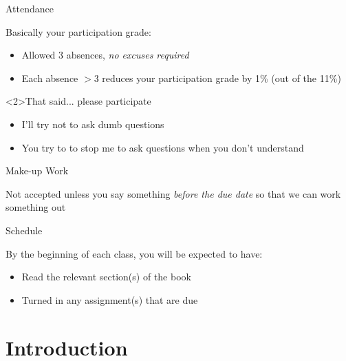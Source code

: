 \documentclass{beamer}
\begin{document}
    \begin{frame}{Attendance}
      \begin{block}{}
        Basically your participation grade:
        \begin{itemize}
          \item Allowed 3 absences, \emph{no excuses required}
          \item Each absence $>$3 reduces your participation grade by 1\% (out of the 11\%)
        \end{itemize}
      \end{block}
      \begin{alertblock}<2>{That said... please participate}
        \begin{itemize}
          \item I'll try not to ask dumb questions
          \item You try to to stop me to ask questions when you don't understand
        \end{itemize}
      \end{alertblock}
    \end{frame}

    \begin{frame}{Make-up Work}
      \begin{block}{}
        Not accepted unless you say something \emph{before the due date} so that we can work something out
      \end{block}
    \end{frame}

    \begin{frame}{Schedule}
      \begin{block}{}
        By the beginning of each class, you will be expected to have:
        \begin{itemize}
          \item Read the relevant section(s) of the book
          \item Turned in any assignment(s) that are due
        \end{itemize}
      \end{block}
    \end{frame}

  \section{Introduction}
\end{document}
